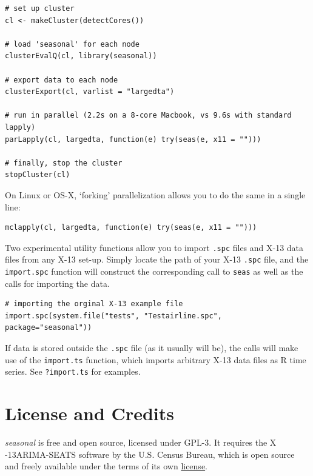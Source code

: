\begin{verbatim}
# set up cluster
cl <- makeCluster(detectCores())

# load 'seasonal' for each node
clusterEvalQ(cl, library(seasonal))

# export data to each node
clusterExport(cl, varlist = "largedta")

# run in parallel (2.2s on a 8-core Macbook, vs 9.6s with standard lapply)
parLapply(cl, largedta, function(e) try(seas(e, x11 = "")))

# finally, stop the cluster
stopCluster(cl)
\end{verbatim}

On Linux or OS-X, `forking' parallelization allows you to do the same in
a single line:

\begin{verbatim}
mclapply(cl, largedta, function(e) try(seas(e, x11 = "")))
\end{verbatim}


Two experimental utility functions allow you to import \texttt{.spc}
files and X-13 data files from any X-13 set-up. Simply locate the path
of your X-13 \texttt{.spc} file, and the \texttt{import.spc} function
will construct the corresponding call to \texttt{seas} as well as the
calls for importing the data.

\begin{verbatim}
# importing the orginal X-13 example file
import.spc(system.file("tests", "Testairline.spc", package="seasonal"))
\end{verbatim}

If data is stored outside the \texttt{.spc} file (as it usually will
be), the calls will make use of the \texttt{import.ts} function, which
imports arbitrary X-13 data files as R time series. See
\texttt{?import.ts} for examples.

\section{License and Credits}\label{license-and-credits}

\emph{seasonal} is free and open source, licensed under GPL-3. It
requires the X -13ARIMA-SEATS software by the U.S. Census Bureau, which
is open source and freely available under the terms of its own
\href{https://www.census.gov/srd/www/disclaimer.html}{license}.

